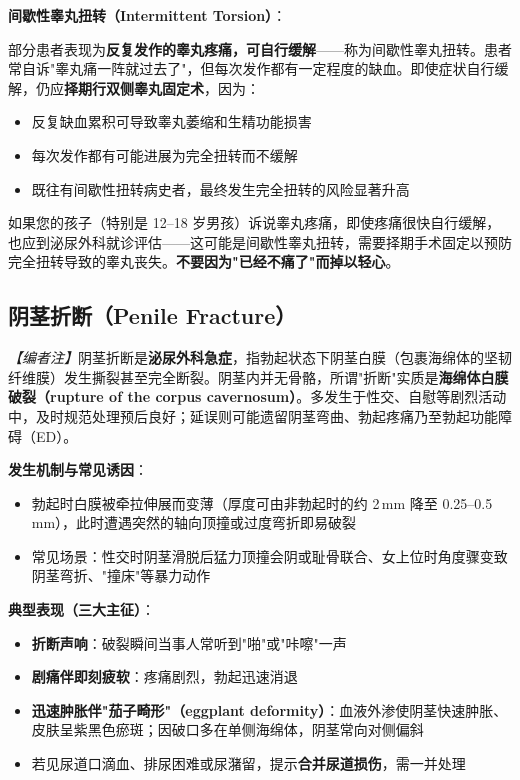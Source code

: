 \documentclass[12pt,a4paper,twoside]{ctexbook}
\begin{document}
\vspace{0.5em}
\noindent\textbf{间歇性睾丸扭转（Intermittent Torsion）}：

部分患者表现为\textbf{反复发作的睾丸疼痛，可自行缓解}——称为间歇性睾丸扭转。患者常自诉"睾丸痛一阵就过去了"，但每次发作都有一定程度的缺血。即使症状自行缓解，仍应\textbf{择期行双侧睾丸固定术}，因为：
\begin{itemize}[leftmargin=2cm]
	\item 反复缺血累积可导致睾丸萎缩和生精功能损害
	\item 每次发作都有可能进展为完全扭转而不缓解
	\item 既往有间歇性扭转病史者，最终发生完全扭转的风险显著升高
\end{itemize}

\begin{tcolorbox}[colback=pink!5!white,colframe=red!50!black,title=贴心小叮咛]
如果您的孩子（特别是 12--18 岁男孩）诉说睾丸疼痛，即使疼痛很快自行缓解，也应到泌尿外科就诊评估——这可能是间歇性睾丸扭转，需要择期手术固定以预防完全扭转导致的睾丸丧失。\textbf{不要因为"已经不痛了"而掉以轻心}。
\end{tcolorbox}

\subsection{阴茎折断（Penile Fracture）}
\label{subsec:penile_fracture}

\noindent\textit{【编者注】}阴茎折断是\textbf{泌尿外科急症}，指勃起状态下阴茎白膜（包裹海绵体的坚韧纤维膜）发生撕裂甚至完全断裂。阴茎内并无骨骼，所谓"折断"实质是\textbf{海绵体白膜破裂（rupture of the corpus cavernosum）}。多发生于性交、自慰等剧烈活动中，及时规范处理预后良好；延误则可能遗留阴茎弯曲、勃起疼痛乃至勃起功能障碍（ED）。

\vspace{0.5em}
\noindent\textbf{发生机制与常见诱因}：
\begin{itemize}[leftmargin=2cm]
	\item 勃起时白膜被牵拉伸展而变薄（厚度可由非勃起时的约 2\,mm 降至 0.25--0.5\,mm），此时遭遇突然的轴向顶撞或过度弯折即易破裂
	\item 常见场景：性交时阴茎滑脱后猛力顶撞会阴或耻骨联合、女上位时角度骤变致阴茎弯折、"撞床"等暴力动作
\end{itemize}

\vspace{0.5em}
\noindent\textbf{典型表现（三大主征）}：
\begin{itemize}[leftmargin=2cm]
	\item \textbf{折断声响}：破裂瞬间当事人常听到"啪"或"咔嚓"一声
	\item \textbf{剧痛伴即刻疲软}：疼痛剧烈，勃起迅速消退
	\item \textbf{迅速肿胀伴"茄子畸形"（eggplant deformity）}：血液外渗使阴茎快速肿胀、皮肤呈紫黑色瘀斑；因破口多在单侧海绵体，阴茎常向对侧偏斜
	\item 若见尿道口滴血、排尿困难或尿潴留，提示\textbf{合并尿道损伤}，需一并处理
\end{itemize}
\end{document}
